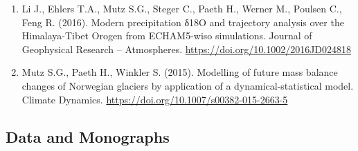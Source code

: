 \documentclass[
  letterpaper,
  DIV=11,
  numbers=noendperiod]{scrartcl}
\begin{document}
\begin{enumerate}
  ECHAM5-wiso Simulations: Statistical Analysis of Temperature,
  Topography and Precipitation. Journal of Geophysical Research --
  Atmospheres. \url{https://doi.org/10.1002/2016JD024856}
\item
  Li J., Ehlers T.A., Mutz S.G., Steger C., Paeth H., Werner M., Poulsen
  C., Feng R. (2016). Modern precipitation δ18O and trajectory analysis
  over the Himalaya-Tibet Orogen from ECHAM5-wiso simulations. Journal
  of Geophysical Research -- Atmospheres.
  \url{https://doi.org/10.1002/2016JD024818}
\item
  Mutz S.G., Paeth H., Winkler S. (2015). Modelling of future mass
  balance changes of Norwegian glaciers by application of a
  dynamical-statistical model. Climate Dynamics.
  \url{https://doi.org/10.1007/s00382-015-2663-5}
\end{enumerate}

\subsection{Data and Monographs}\label{data-and-monographs}
\end{document}
